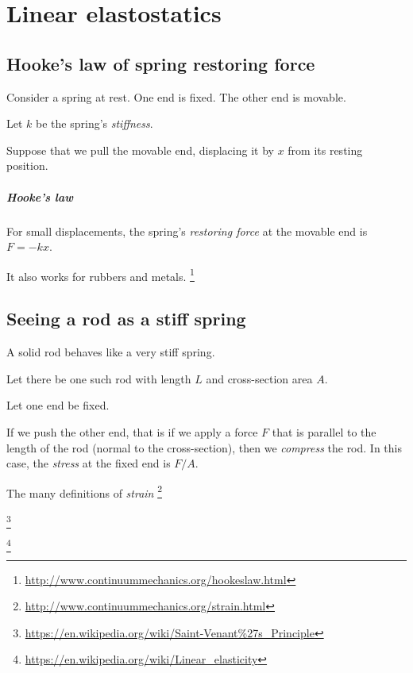 \chapter{Linear elastostatics}

\section{Hooke's law of spring restoring force}
\label{sec:hooke-s-law}

Consider a spring at rest.
One end is fixed.
The other end is movable.

Let \(k\) be the spring's \emph{stiffness}.

Suppose that we pull the movable end,
displacing it by \(x\) from its resting position.

%
%
%
%
\paragraph{Hooke's law}
For small displacements,
the spring's \emph{restoring force} at the movable end is \( F = - k x \).

It also works for rubbers and metals.%
\footnote{\url{http://www.continuummechanics.org/hookeslaw.html}}

\section{Seeing a rod as a stiff spring}

A solid rod behaves like a very stiff spring.

Let there be one such rod with length \(L\) and cross-section area \(A\).

Let one end be fixed.

If we push the other end,
that is if we apply a force \(F\) that is parallel
to the length of the rod (normal to the cross-section),
then we \emph{compress} the rod.
In this case, the \emph{stress} at the fixed end is \(F/A\).

The many definitions of \emph{strain}%
\footnote{\url{http://www.continuummechanics.org/strain.html}}

\footnote{\url{https://en.wikipedia.org/wiki/Saint-Venant\%27s_Principle}}

\footnote{\url{https://en.wikipedia.org/wiki/Linear_elasticity}}

